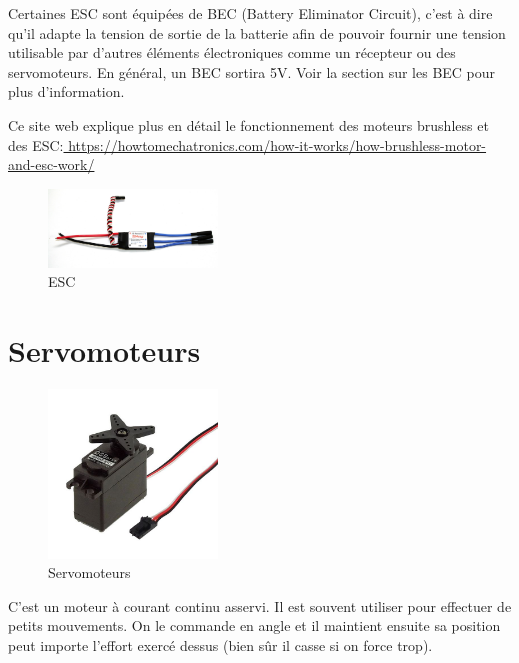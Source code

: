 \documentclass[a4paper, 11pt]{report}
\begin{document}
Certaines ESC sont équipées de BEC (Battery Eliminator Circuit), c'est à dire qu'il adapte la tension de sortie de la batterie afin de pouvoir fournir une tension utilisable par d'autres éléments électroniques comme un récepteur ou des servomoteurs. En général, un BEC sortira 5V. Voir la section sur les BEC pour plus d'information.

Ce site web explique plus en détail le fonctionnement des moteurs brushless et des ESC:\url{ https://howtomechatronics.com/how-it-works/how-brushless-motor-and-esc-work/}

\begin{figure}[h!]
\begin{centering}
\includegraphics[width=0.4\textwidth]{images/ESC.jpg}
\caption{ESC}
\par\end{centering}
\end{figure}

\section{Servomoteurs}

\begin{figure}[h!]
\begin{centering}
\includegraphics[width=0.4\textwidth]{images/servomoteur.jpg}
\caption{Servomoteurs}
\par\end{centering}
\end{figure}

C'est un moteur à courant continu asservi. Il est souvent utiliser pour effectuer de petits mouvements. On le commande en angle et il maintient ensuite sa position peut importe l'effort exercé dessus (bien sûr il casse si on force trop).
\end{document}
